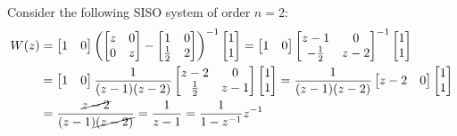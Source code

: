 \begin{example}{Consider the following SISO system of order $n=2$:}
\begin{align*}
W(z) &=
\begin{bmatrix}
    1 & 0\\
\end{bmatrix}
\left( \begin{bmatrix}
    z & 0\\
    0 & z\\
\end{bmatrix}
-
\begin{bmatrix}
    1 & 0 \\
    \frac{1}{2} & 2\\
\end{bmatrix}\right)^{-1}
\begin{bmatrix}
    1\\
    1\\
\end{bmatrix}
= \begin{bmatrix}
    1 & 0\\
\end{bmatrix}
\begin{bmatrix}
    z-1 & 0\\
    -\frac{1}{2} & z-2\\
\end{bmatrix}^{-1}
\begin{bmatrix}
    1\\
    1\\
\end{bmatrix}\\
&= \begin{bmatrix}
    1 & 0\\
\end{bmatrix}
\frac{1}{(z-1)(z-2)}
\begin{bmatrix}
    z-2 & 0\\
    \frac{1}{2} & z-1\\
\end{bmatrix}
\begin{bmatrix}
    1\\
    1\\
\end{bmatrix}
=
\frac{1}{(z-1)(z-2)}
\begin{bmatrix}
    z-2 & 0\\
\end{bmatrix}
\begin{bmatrix}
    1\\
    1\\
\end{bmatrix}\\
&=
\frac{\cancel{z-2}}{(z-1)\cancel{(z-2)}} = \frac{1}{z-1} = \frac{1}{1-z^{-1}} z^{-1}

\end{align*}
\end{example}
